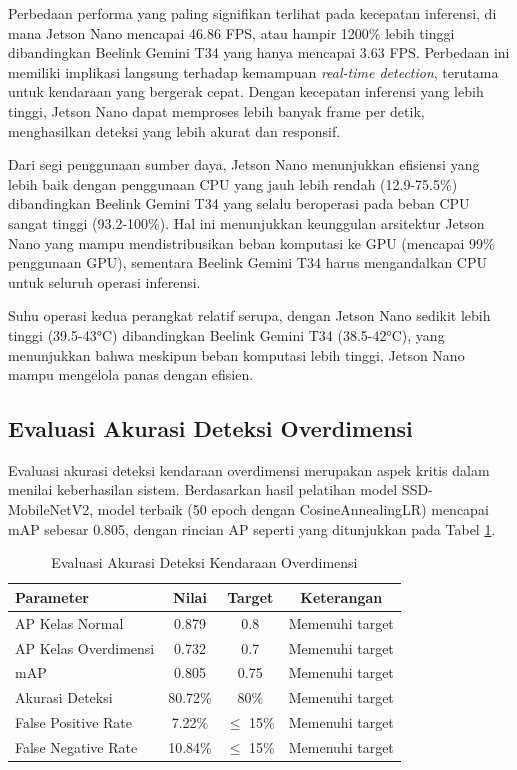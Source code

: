 Perbedaan performa yang paling signifikan terlihat pada kecepatan inferensi, di mana Jetson Nano mencapai 46.86 FPS, atau hampir 1200\% lebih tinggi dibandingkan Beelink Gemini T34 yang hanya mencapai 3.63 FPS. Perbedaan ini memiliki implikasi langsung terhadap kemampuan \emph{real-time detection}, terutama untuk kendaraan yang bergerak cepat. Dengan kecepatan inferensi yang lebih tinggi, Jetson Nano dapat memproses lebih banyak frame per detik, menghasilkan deteksi yang lebih akurat dan responsif.

Dari segi penggunaan sumber daya, Jetson Nano menunjukkan efisiensi yang lebih baik dengan penggunaan CPU yang jauh lebih rendah (12.9-75.5\%) dibandingkan Beelink Gemini T34 yang selalu beroperasi pada beban CPU sangat tinggi (93.2-100\%). Hal ini menunjukkan keunggulan arsitektur Jetson Nano yang mampu mendistribusikan beban komputasi ke GPU (mencapai 99\% penggunaan GPU), sementara Beelink Gemini T34 harus mengandalkan CPU untuk seluruh operasi inferensi.

Suhu operasi kedua perangkat relatif serupa, dengan Jetson Nano sedikit lebih tinggi (39.5-43°C) dibandingkan Beelink Gemini T34 (38.5-42°C), yang menunjukkan bahwa meskipun beban komputasi lebih tinggi, Jetson Nano mampu mengelola panas dengan efisien.

\subsection{Evaluasi Akurasi Deteksi Overdimensi}

Evaluasi akurasi deteksi kendaraan overdimensi merupakan aspek kritis dalam menilai keberhasilan sistem. Berdasarkan hasil pelatihan model SSD-MobileNetV2, model terbaik (50 epoch dengan CosineAnnealingLR) mencapai mAP sebesar 0.805, dengan rincian AP seperti yang ditunjukkan pada Tabel \ref{tab:od_accuracy}.

\begin{table}[htbp]
  \centering
  \caption{Evaluasi Akurasi Deteksi Kendaraan Overdimensi}
  \label{tab:od_accuracy}
  \setlength{\tabcolsep}{4pt}
  \small
  \begin{tabular}{|l|c|c|c|}
  \hline
  \rowcolor[HTML]{C0C0C0}
  \textbf{Parameter} & \textbf{Nilai} & \textbf{Target} & \textbf{Keterangan} \\
  \hline
  AP Kelas Normal & 0.879 & 0.8 & Memenuhi target \\
  \hline
  AP Kelas Overdimensi & 0.732 & 0.7 & Memenuhi target \\
  \hline
  mAP & 0.805 & 0.75 & Memenuhi target \\
  \hline
  Akurasi Deteksi & 80.72\% & 80\% & Memenuhi target \\
  \hline
  False Positive Rate & 7.22\% & $\leq$ 15\% & Memenuhi target \\
  \hline
  False Negative Rate & 10.84\% & $\leq$ 15\% & Memenuhi target \\
  \hline
  \end{tabular}
\end{table}


